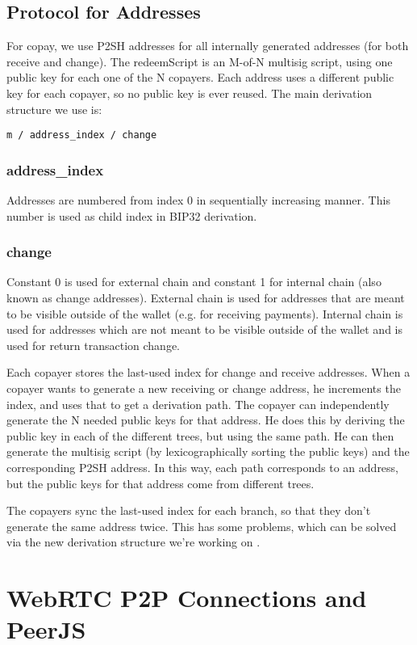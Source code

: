 \documentclass{article}
\begin{document}
\subsection{Protocol for Addresses}
For copay, we use P2SH addresses for all internally generated addresses (for both receive and change).
The redeemScript is an M-of-N multisig script, using one public key for each one of the N copayers.
Each address uses a different public key for each copayer, so no public key is ever reused.
The main derivation structure we use is:
\begin{verbatim}
m / address_index / change
\end{verbatim}

\subsubsection{address\_index}
Addresses are numbered from index 0 in sequentially increasing manner. This number is used as child index in BIP32 derivation.
\subsubsection{change}
Constant 0 is used for external chain and constant 1 for internal chain (also known as change addresses).
External chain is used for addresses that are meant to be visible outside of the wallet (e.g. for receiving payments).
Internal chain is used for addresses which are not meant to be visible outside of the wallet and is used for return transaction change.

Each copayer stores the last-used index for change and receive addresses.
When a copayer wants to generate a new receiving or change address, he increments the index, and uses that to get a derivation path.
The copayer can independently generate the N needed public keys for that address.
He does this by deriving the public key in each of the different trees, but using the same path.
He can then generate the multisig script (by lexicographically sorting the public keys) and the corresponding P2SH address.
In this way, each path corresponds to an address, but the public keys for that address come from different trees.

The copayers sync the last-used index for each branch, so that they don't generate the same address twice.
This has some problems, which can be solved via the new derivation structure we're working on \cite{bipnn}.


\section{WebRTC P2P Connections and PeerJS}
\end{document}
